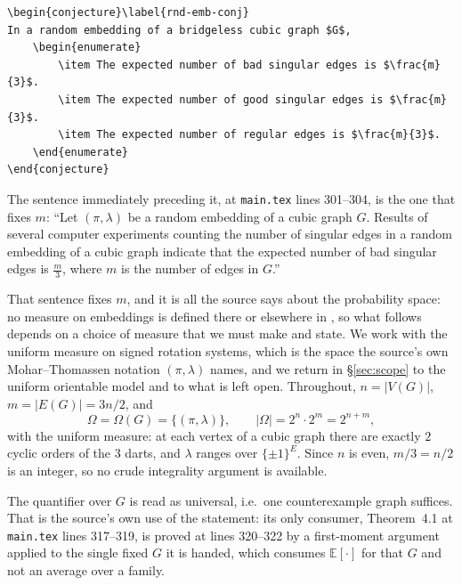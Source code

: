 \documentclass[11pt]{amsart}
\begin{document}
\begingroup\footnotesize
\begin{verbatim}
\begin{conjecture}\label{rnd-emb-conj}
In a random embedding of a bridgeless cubic graph $G$,
    \begin{enumerate}
        \item The expected number of bad singular edges is $\frac{m}{3}$.
        \item The expected number of good singular edges is $\frac{m}{3}$.
        \item The expected number of regular edges is $\frac{m}{3}$.
    \end{enumerate}
\end{conjecture}
\end{verbatim}
\endgroup

\noindent
The sentence immediately preceding it, at \texttt{main.tex} lines 301--304,
is the one that fixes $m$: ``Let $(\pi,\lambda)$ be a
random embedding of a cubic graph $G$. Results of several computer experiments
counting the number of singular edges in a random embedding of a cubic graph
indicate that the expected number of bad singular edges is $\frac{m}{3}$,
where $m$ is the number of edges in $G$.''

That sentence fixes $m$, and it is all the source says about the probability
space: no measure on embeddings is defined there or elsewhere in \cite{GS}, so
what follows depends on a choice of measure that we must make and state. We
work with the uniform measure on signed rotation systems, which is the space
the source's own Mohar--Thomassen notation $(\pi,\lambda)$ names, and we return
in \S\ref{sec:scope} to the uniform orientable model and to what is left
open. Throughout, $n=|V(G)|$, $m=|E(G)|=3n/2$, and
\[
 \Omega=\Omega(G)=\{(\pi,\lambda)\}, \qquad |\Omega|=2^{n}\cdot 2^{m}=2^{n+m},
\]
with the uniform measure: at each vertex of a cubic graph there are exactly
$2$ cyclic orders of the $3$ darts, and $\lambda$ ranges over $\{\pm1\}^{E}$.
Since $n$ is even, $m/3=n/2$ is an integer, so no crude integrality argument is
available.

The quantifier over $G$ is read as universal, i.e.\ one counterexample graph
suffices. That is the source's own use of the statement: its only consumer,
Theorem~4.1 at \texttt{main.tex} lines 317--319, is proved at lines 320--322 by
a first-moment argument applied to the single fixed $G$ it is handed, which
consumes $\mathbb{E}[\cdot]$ for that $G$ and not an average over a family.
\end{document}
